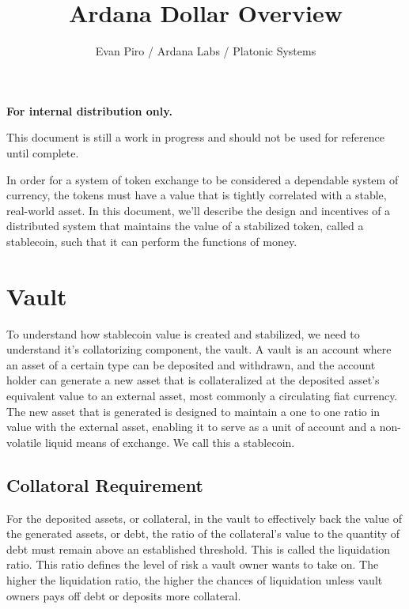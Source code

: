 \documentclass[12pt]{article}
\title{Ardana Dollar Overview}
\author{Evan Piro / Ardana Labs / Platonic Systems}
\begin{document}
\maketitle

\begin{center}
	\textbf{For internal distribution only.}
\end{center}

\begin{center}
	\color{red} This document is still a work in progress and should not be used for reference until complete.
\end{center}

In order for a system of token exchange to be considered a dependable system of currency, the tokens must have a value that is tightly correlated with a stable, real-world asset. In this document, we'll describe the design and incentives of a distributed system that maintains the value of a stabilized token, called a stablecoin, such that it can perform the functions of money.

\section{Vault}

To understand how stablecoin value is created and stabilized, we need to understand it's collatorizing component, the vault. A vault is an account where an asset of a certain type can be deposited and withdrawn, and the account holder can generate a new asset that is collateralized at the deposited asset's equivalent value to an external asset, most commonly a circulating fiat currency. The new asset that is generated is designed to maintain a one to one ratio in value with the external asset, enabling it to serve as a unit of account and a non-volatile liquid means of exchange. We call this a stablecoin.

\subsection{Collatoral Requirement}

For the deposited assets, or collateral, in the vault to effectively back the value of the generated assets, or debt, the ratio of the collateral's value to the quantity of debt must remain above an established threshold. This is called the liquidation ratio. This ratio defines the level of risk a vault owner wants to take on. The higher the liquidation ratio, the higher the chances of liquidation unless vault owners pays off debt or deposits more collateral.
\end{document}
